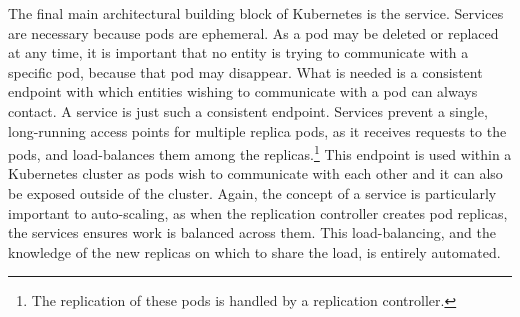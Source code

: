 The final main architectural building block of Kubernetes is the service.
Services are necessary because pods are ephemeral. As a pod may be deleted or
replaced at any time, it is important that no entity is trying to communicate
with a specific pod, because that pod may disappear. What is needed is a
consistent endpoint with which entities wishing to communicate with a pod can
always contact. A service is just such a consistent endpoint. Services prevent a
single, long-running access points for multiple replica pods, as it receives
requests to the pods, and load-balances them among the replicas.\footnote{The replication of
these pods is handled by a replication controller.} This endpoint is used within
a Kubernetes cluster as pods wish to communicate with each other and it can also
be exposed outside of the cluster. Again, the concept of a service is
particularly important to auto-scaling, as when the replication
controller creates pod replicas, the services ensures work is balanced across
them. This load-balancing, and the knowledge of the new replicas on which to
share the load, is entirely automated.\cite{k8s-services}
